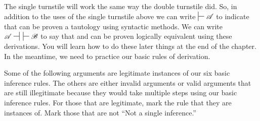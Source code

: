 The single turnstile will work the same way the double turnstile did. So, in addition to the uses of the single turnstile above we can write  $\sststile{}{} \script{A}$ to indicate that  can be proven a tautology using syntactic methods. We can write $\script{A}\nsststile{}{} \hspace{.5em}  \sststile{}{}\script{B}$ to say that  and  can be proven logically equivalent using these derivations. You will learn how to do these later things at the end of the chapter. In the meantime, we need to practice our basic rules of derivation.

\practiceproblems
\noindent\problempart Some of the following arguments are legitimate instances of our six basic inference rules. The others are either invalid arguments or valid arguments that are still illegitimate because they would take multiple steps using our basic inference rules. For those that are legitimate, mark the rule that they are instances of. Mark those that are not ``Not a single inference.'' 

